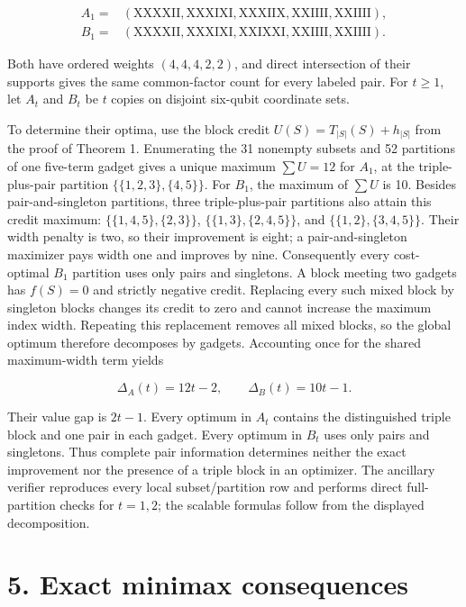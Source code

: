 \documentclass[
  11pt,
]{article}
\begin{document}
\[
\begin{aligned}
A_1={}&(\mathrm{XXXXII},\mathrm{XXXIXI},\mathrm{XXXIIX},
        \mathrm{XXIIII},\mathrm{XXIIII}),\\
B_1={}&(\mathrm{XXXXII},\mathrm{XXXIXI},\mathrm{XXIXXI},
        \mathrm{XXIIII},\mathrm{XXIIII}).
\end{aligned}
\]

Both have ordered weights \((4,4,4,2,2)\), and direct intersection of
their supports gives the same common-factor count for every labeled
pair. For \(t\ge1\), let \(A_t\) and \(B_t\) be \(t\) copies on disjoint
six-qubit coordinate sets.

To determine their optima, use the block credit
\(U(S)=T_{|S|}(S)+h_{|S|}\) from the proof of Theorem 1. Enumerating the
31 nonempty subsets and 52 partitions of one five-term gadget gives a
unique maximum \(\sum U=12\) for \(A_1\), at the triple-plus-pair
partition \(\{\{1,2,3\},\{4,5\}\}\). For \(B_1\), the maximum of
\(\sum U\) is 10. Besides pair-and-singleton partitions, three
triple-plus-pair partitions also attain this credit maximum:
\(\{\{1,4,5\},\{2,3\}\}\), \(\{\{1,3\},\{2,4,5\}\}\), and
\(\{\{1,2\},\{3,4,5\}\}\). Their width penalty is two, so their
improvement is eight; a pair-and-singleton maximizer pays width one and
improves by nine. Consequently every cost-optimal \(B_1\) partition uses
only pairs and singletons. A block meeting two gadgets has \(f(S)=0\)
and strictly negative credit. Replacing every such mixed block by
singleton blocks changes its credit to zero and cannot increase the
maximum index width. Repeating this replacement removes all mixed
blocks, so the global optimum therefore decomposes by gadgets.
Accounting once for the shared maximum-width term yields

\[
\Delta_A(t)=12t-2,
\qquad
\Delta_B(t)=10t-1.
\]

Their value gap is \(2t-1\). Every optimum in \(A_t\) contains the
distinguished triple block and one pair in each gadget. Every optimum in
\(B_t\) uses only pairs and singletons. Thus complete pair information
determines neither the exact improvement nor the presence of a triple
block in an optimizer. The ancillary verifier reproduces every local
subset/partition row and performs direct full-partition checks for
\(t=1,2\); the scalable formulas follow from the displayed
decomposition.

\hypertarget{exact-minimax-consequences}{%
\section{5. Exact minimax
consequences}\label{exact-minimax-consequences}}
\end{document}
